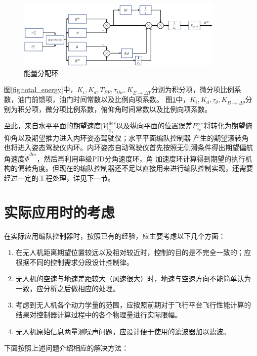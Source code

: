\begin{figure}[H]
    \centering
    \includegraphics[width=0.9\textwidth]{figures/c3/TECS_pitch.jpg}
    \caption{能量分配环}\label{fig:balance_energy}
\end{figure}
图\ref{fig:total_energy}中，$K_i,K_d,T_{FF},\tau_{thr},K_{\dot{E}\rightarrow\Delta T}$分别为积分项，微分项比例系数，油门前馈项，油门时间常数以及比例向项系数。
图\ref{fig:balance_energy}中，$K_i,K_d,\tau_{\theta},K_{\dot{B}\rightarrow\Delta \theta}$分别为积分项，微分项比例系数，俯仰角时间常数以及比例向项系数。

至此，来自水平平面的期望速度$|V|_{x_k}^{des}$以及纵向平面的位置误差$P_{z_k}^{err}$将转化为期望俯仰角以及期望推力进入内环姿态驾驶仪；水平平面编队控制器
产生的期望滚转角也将进入姿态驾驶仪内环。内环姿态自动驾驶仪首先按照无侧滑条件得出期望偏航角速度$\dot{\Phi}^{des}$，然后再利用串级PID分角速度环，角
加速度环计算得到期望的执行机构的偏转角度。但现在的编队控制器还不足以直接用来进行编队控制实现，还需要经过一定的工程处理，详见下一节。
\section{实际应用时的考虑}
在实际应用编队控制器时，按照已有的经验，应主要考虑以下几个方面：
\begin{enumerate}
    \item 在无人机距离期望位置较远以及相对较近时，控制的目的是不完全一致的；应根据不同的控制需求分段设计控制律。
    \item 无人机的空速与地速差距较大（风速很大）时，地速与空速方向不能简单认为一致，应分析之后做相应的处理。
    \item 考虑到无人机各个动力学量的范围，应按照前期对于飞行平台飞行性能计算的结果对控制器计算过程中的各个物理量进行实际限幅。
    \item 无人机原始信息两量测噪声问题，应设计便于使用的滤波器加以滤波。
\end{enumerate}
下面按照上述问题介绍相应的解决方法：


